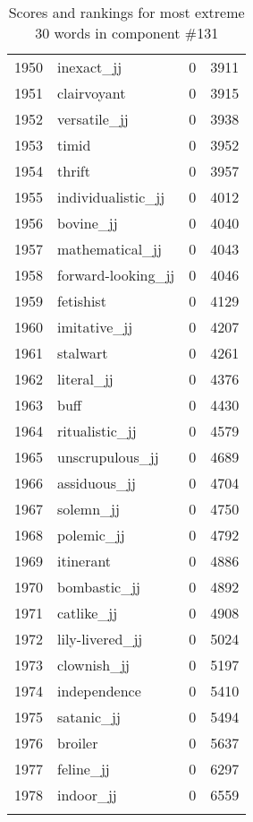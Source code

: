 \begin{longtable}[!htbp]{| rlr@{.}l |}
    1950 & inexact\_jj & 0 & 3911 \\
    1951 & clairvoyant & 0 & 3915 \\
    1952 & versatile\_jj & 0 & 3938 \\
    1953 & timid & 0 & 3952 \\
    1954 & thrift & 0 & 3957 \\
    1955 & individualistic\_jj & 0 & 4012 \\
    1956 & bovine\_jj & 0 & 4040 \\
    1957 & mathematical\_jj & 0 & 4043 \\
    1958 & forward-looking\_jj & 0 & 4046 \\
    1959 & fetishist & 0 & 4129 \\
    1960 & imitative\_jj & 0 & 4207 \\
    1961 & stalwart & 0 & 4261 \\
    1962 & literal\_jj & 0 & 4376 \\
    1963 & buff & 0 & 4430 \\
    1964 & ritualistic\_jj & 0 & 4579 \\
    1965 & unscrupulous\_jj & 0 & 4689 \\
    1966 & assiduous\_jj & 0 & 4704 \\
    1967 & solemn\_jj & 0 & 4750 \\
    1968 & polemic\_jj & 0 & 4792 \\
    1969 & itinerant & 0 & 4886 \\
    1970 & bombastic\_jj & 0 & 4892 \\
    1971 & catlike\_jj & 0 & 4908 \\
    1972 & lily-livered\_jj & 0 & 5024 \\
    1973 & clownish\_jj & 0 & 5197 \\
    1974 & independence & 0 & 5410 \\
    1975 & satanic\_jj & 0 & 5494 \\
    1976 & broiler & 0 & 5637 \\
    1977 & feline\_jj & 0 & 6297 \\
    1978 & indoor\_jj & 0 & 6559 \\
    \hline
    \caption{Scores and rankings for most extreme 30 words in component \#131} \\
\end{longtable}
